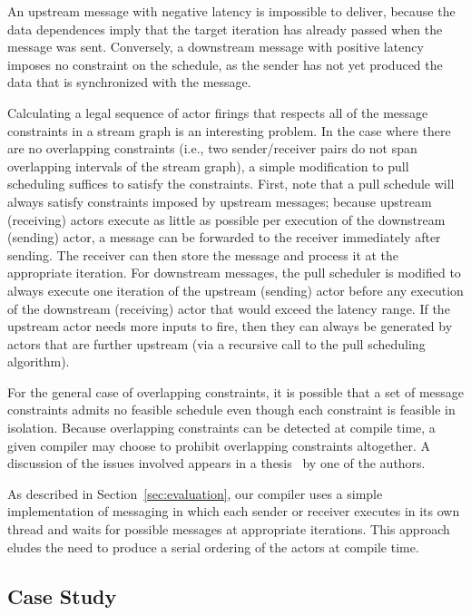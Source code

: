 An upstream message with negative latency is impossible to deliver,
because the data dependences imply that the target iteration has
already passed when the message was sent.  Conversely, a downstream
message with positive latency imposes no constraint on the schedule,
as the sender has not yet produced the data that is synchronized with
the message.

Calculating a legal sequence of actor firings that respects all of the
message constraints in a stream graph is an interesting problem.  In
the case where there are no overlapping constraints (i.e., two
sender/receiver pairs do not span overlapping intervals of the stream
graph), a simple modification to pull scheduling suffices to satisfy
the constraints.  First, note that a pull schedule will always satisfy
constraints imposed by upstream messages; because upstream (receiving)
actors execute as little as possible per execution of the downstream
(sending) actor, a message can be forwarded to the receiver
immediately after sending.  The receiver can then store the message
and process it at the appropriate iteration.  For downstream messages,
the pull scheduler is modified to always execute one iteration of the
upstream (sending) actor before any execution of the downstream
(receiving) actor that would exceed the latency range.  If the
upstream actor needs more inputs to fire, then they can always be
generated by actors that are further upstream (via a recursive call to
the pull scheduling algorithm).

For the general case of overlapping constraints, it is possible that a
set of message constraints admits no feasible schedule even though
each constraint is feasible in isolation.  Because overlapping
constraints can be detected at compile time, a given compiler may
choose to prohibit overlapping constraints altogether.  A discussion
of the issues involved appears in a thesis~\cite{karczma-thesis} by
one of the authors.

As described in Section~\ref{sec:evaluation}, our compiler uses a
simple implementation of messaging in which each sender or receiver
executes in its own thread and waits for possible messages at
appropriate iterations.  This approach eludes the need to produce a
serial ordering of the actors at compile time.

%

\subsection{Case Study}

